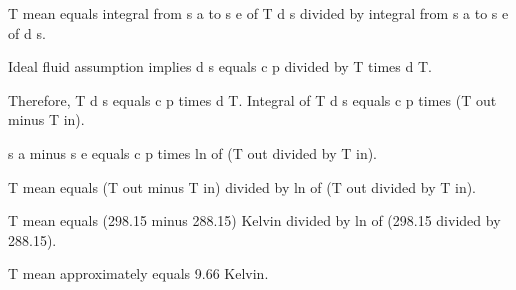 T mean equals integral from s a to s e of T d s divided by integral from s a to s e of d s.  

Ideal fluid assumption implies d s equals c p divided by T times d T.  

Therefore, T d s equals c p times d T. Integral of T d s equals c p times (T out minus T in).  

s a minus s e equals c p times ln of (T out divided by T in).  

T mean equals (T out minus T in) divided by ln of (T out divided by T in).  

T mean equals (298.15 minus 288.15) Kelvin divided by ln of (298.15 divided by 288.15).  

T mean approximately equals 9.66 Kelvin.